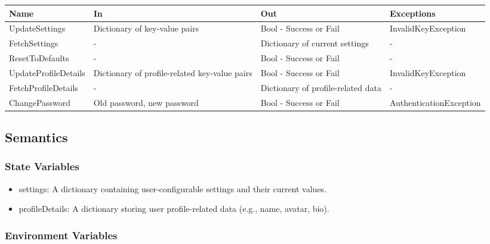 \documentclass[12pt, titlepage]{article}
\begin{document}
\begin{center}
  \begin{tabular}{p{4cm} p{4cm} p{4cm} p{4cm}}
    \hline
    \textbf{Name}        & \textbf{In}                                   & \textbf{Out}                       & \textbf{Exceptions}     \\
    \hline
    UpdateSettings       & Dictionary of key-value pairs                 & Bool - Success or Fail             & InvalidKeyException     \\
    \hline
    FetchSettings        & -                                             & Dictionary of current settings     & -                       \\
    \hline
    ResetToDefaults      & -                                             & Bool - Success or Fail             & -                       \\
    \hline
    UpdateProfileDetails & Dictionary of profile-related key-value pairs & Bool - Success or Fail             & InvalidKeyException     \\
    \hline
    FetchProfileDetails  & -                                             & Dictionary of profile-related data & -                       \\
    \hline
    ChangePassword       & Old password, new password                    & Bool - Success or Fail             & AuthenticationException \\
    \hline
  \end{tabular}
\end{center}


\subsection{Semantics}

\subsubsection{State Variables}

\begin{itemize}
  \item settings: A dictionary containing user-configurable settings and their current values.
  \item profileDetails: A dictionary storing user profile-related data (e.g., name, avatar, bio).
\end{itemize}

\subsubsection{Environment Variables}
\end{document}
